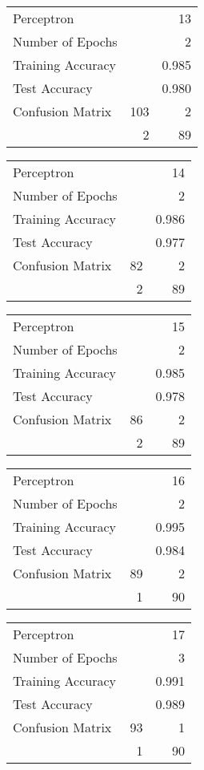 \documentclass[11pt,twocolumn]{article}
\begin{document}
\begin{center}
\begin{tabular}{l | r r}
Perceptron &&13\\
Number of Epochs & &2\\
Training Accuracy & &0.985\\
Test Accuracy & &0.980\\
Confusion Matrix &103 & 2\\
 &2 & 89\\
\end{tabular}
\end{center}
\begin{center}
\begin{tabular}{l | r r}
Perceptron &&14\\
Number of Epochs & &2\\
Training Accuracy & &0.986\\
Test Accuracy & &0.977\\
Confusion Matrix &82 & 2\\
 &2 & 89\\
\end{tabular}
\end{center}
\begin{center}
\begin{tabular}{l | r r}
Perceptron &&15\\
Number of Epochs & &2\\
Training Accuracy & &0.985\\
Test Accuracy & &0.978\\
Confusion Matrix &86 & 2\\
 &2 & 89\\
\end{tabular}
\end{center}
\begin{center}
\begin{tabular}{l | r r}
Perceptron &&16\\
Number of Epochs & &2\\
Training Accuracy & &0.995\\
Test Accuracy & &0.984\\
Confusion Matrix &89 & 2\\
 &1 & 90\\
\end{tabular}
\end{center}
\begin{center}
\begin{tabular}{l | r r}
Perceptron &&17\\
Number of Epochs & &3\\
Training Accuracy & &0.991\\
Test Accuracy & &0.989\\
Confusion Matrix &93 & 1\\
 &1 & 90\\
\end{tabular}
\end{center}
\end{document}
